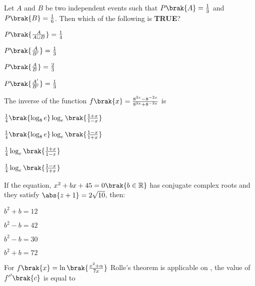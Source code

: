 \item Let $A$ and $B$ be two independent events such that $P\brak{A}=\frac{1}{3}$ and $P\brak{B}=\frac{1}{6}$. Then which of the following is \textbf{TRUE}?

\hfill{}
\begin{enumerate}
\begin{multicols}{4}
\item $P\brak{\frac{A}{A\cup B}}=\frac{1}{4}$
\item $P\brak{\frac{A}{B'}}=\frac{1}{3}$
\item $P\brak{\frac{A}{B}}=\frac{2}{3}$
\item $P\brak{\frac{A'}{B'}}=\frac{1}{3}$
\end{multicols}
\end{enumerate}

\item The inverse of the function $f\brak{x}=\frac{8^{2x}-8^{-2x}}{8^{2x}+8^{-2x}}$ is

\hfill{}
\begin{enumerate}
\begin{multicols}{2}
\item $\frac{1}{4}\brak{\log_8{e}}\log_e{\brak{\frac{1+x}{1-x}}}$
\item $\frac{1}{4}\brak{\log_8{e}}\log_e{\brak{\frac{1-x}{1+x}}}$
\item $\frac{1}{4}\log_e{\brak{\frac{1+x}{1-x}}}$
\item $\frac{1}{4}\log_e{\brak{\frac{1-x}{1+x}}}$
\end{multicols}
\end{enumerate}

\item If the equation, $x^2+bx+45=0 \brak{b\in\mathbb{R}}$ has conjugate complex roots and they satisfy $\abs{z+1}=2\sqrt{10}$, then:

\hfill{}
\begin{enumerate}
\begin{multicols}{4}
\item $b^2+b=12$
\item $b^2-b=42$
\item $b^2-b=30$
\item $b^2+b=72$
\end{multicols}
\end{enumerate}

\item For $f\brak{x}=\ln\brak{\frac{x^2+\alpha}{7x}}$ Rolle's theorem is applicable on , the value of ${f^\prime}^\prime\brak{c}$ is equal to

